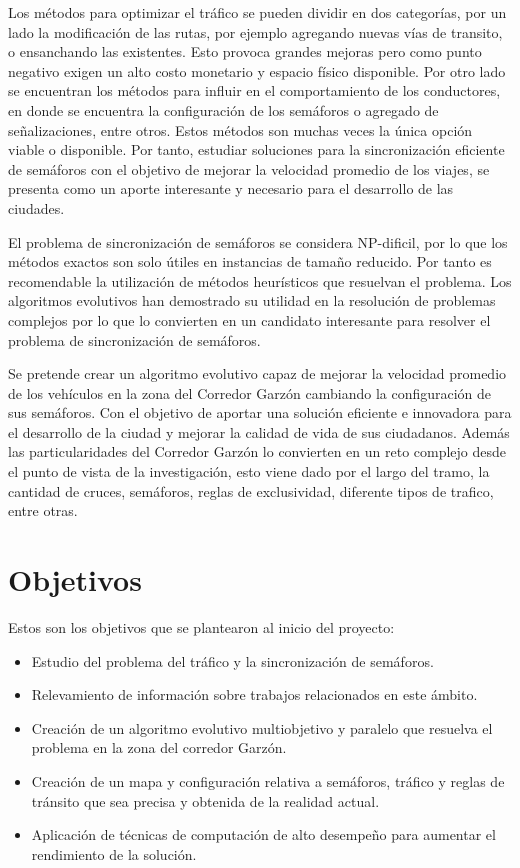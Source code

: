 Los métodos para optimizar el tráfico se pueden dividir en dos categorías, por un lado la modificación de las rutas, por ejemplo agregando nuevas vías de transito, o ensanchando las existentes. Esto provoca grandes mejoras pero como punto negativo exigen un alto costo monetario y espacio físico disponible. Por otro lado se encuentran los métodos para influir en el comportamiento de los conductores, en donde se encuentra la configuración de los semáforos o agregado de señalizaciones, entre otros. Estos métodos son muchas veces la única opción viable o disponible. Por tanto, estudiar soluciones para la sincronización eficiente de semáforos con el objetivo de mejorar la velocidad promedio de los viajes, se presenta como un aporte interesante y necesario para el desarrollo de las ciudades. 

El problema de sincronización de semáforos se considera NP-dificil, por lo que los métodos exactos son solo útiles en instancias de tamaño reducido. Por tanto es recomendable la utilización de métodos heurísticos que resuelvan el problema. Los algoritmos evolutivos han demostrado su utilidad en la resolución de problemas complejos por lo que lo convierten en un candidato interesante para resolver el problema de sincronización de semáforos. 

Se pretende crear un algoritmo evolutivo capaz de mejorar la velocidad promedio de los vehículos en la zona del Corredor Garzón cambiando la configuración de sus semáforos. Con el objetivo de aportar una solución eficiente e innovadora para el desarrollo de la ciudad y mejorar la calidad de vida de sus ciudadanos. Además las particularidades del Corredor Garzón lo convierten en un reto complejo desde el punto de vista de la investigación, esto viene dado por el largo del tramo, la cantidad de cruces, semáforos, reglas de exclusividad, diferente tipos de trafico, entre otras.



\section{Objetivos}

Estos son los objetivos que se plantearon al inicio del proyecto:

\begin{itemize}
	\item Estudio del problema del tráfico y la sincronización de semáforos.
	\item Relevamiento de información sobre trabajos relacionados en este ámbito.
	\item Creación de un algoritmo evolutivo multiobjetivo y paralelo que resuelva el problema en la zona del corredor Garzón.
	\item Creación de un mapa y configuración relativa a semáforos, tráfico y reglas de tránsito que sea precisa y obtenida de la realidad actual.	
	\item Aplicación de técnicas de computación de alto desempeño para aumentar el rendimiento de la solución.

\end{itemize}

